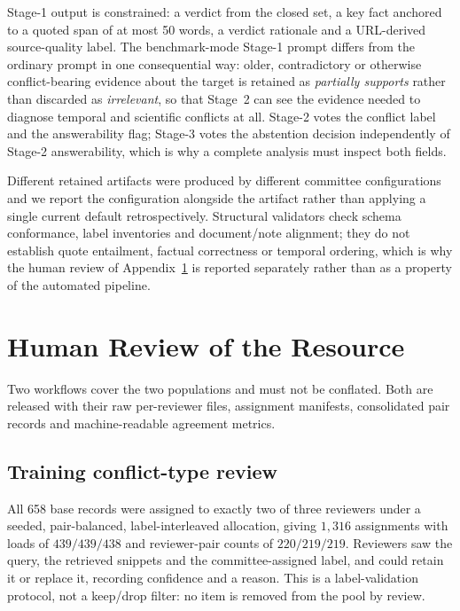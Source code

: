 Stage-1 output is constrained: a verdict from the closed set, a key fact
anchored to a quoted span of at most 50 words, a verdict rationale and a
URL-derived source-quality label. The benchmark-mode Stage-1 prompt differs from
the ordinary prompt in one consequential way: older, contradictory or otherwise
conflict-bearing evidence about the target is retained as \textit{partially
supports} rather than discarded as \textit{irrelevant}, so that Stage~2 can see
the evidence needed to diagnose temporal and scientific conflicts at all.
Stage-2 votes the conflict label and the answerability flag; Stage-3 votes the
abstention decision independently of Stage-2 answerability, which is why a
complete analysis must inspect both fields.

Different retained artifacts were produced by different committee
configurations and we report the configuration alongside the artifact rather
than applying a single current default retrospectively. Structural validators
check schema conformance, label inventories and document/note alignment; they do
not establish quote entailment, factual correctness or temporal ordering, which
is why the human review of Appendix~\ref{app:human-review} is reported
separately rather than as a property of the automated pipeline.

\section{Human Review of the Resource}
\label{app:human-review}

Two workflows cover the two populations and must not be conflated. Both are
released with their raw per-reviewer files, assignment manifests, consolidated
pair records and machine-readable agreement metrics.

\subsection{Training conflict-type review}

All 658 base records were assigned to exactly two of three reviewers under a
seeded, pair-balanced, label-interleaved allocation, giving $1{,}316$ assignments
with loads of $439/439/438$ and reviewer-pair counts of $220/219/219$. Reviewers
saw the query, the retrieved snippets and the committee-assigned label, and could
retain it or replace it, recording confidence and a reason. This is a
label-validation protocol, not a keep/drop filter: no item is removed from the
pool by review.

